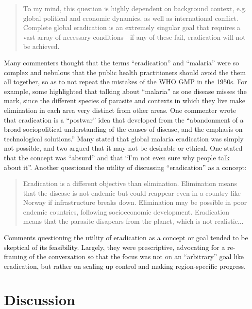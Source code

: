 \documentclass[]{article}
\begin{document}
\begin{quote}
To my mind, this question is highly dependent on background context, e.g. global political and economic dynamics, as well as international conflict. Complete global eradication is an extremely singular goal that requires a vast array of necessary conditions - if any of these fail, eradication will not be achieved.  
\end{quote}

Many commenters thought that the terms ``eradication'' and ``malaria''
were so complex and nebulous that the public health practitioners should
avoid the them all together, so as to not repeat the mistakes of the WHO
GMP in the 1950s. For example, some highlighted that talking about
``malaria'' as one disease misses the mark, since the different species
of parasite and contexts in which they live make elimination in each
area very distinct from other areas. One commenter wrote that
eradication is a ``postwar'' idea that developed from the ``abandonment
of a broad sociopolitical understanding of the causes of disease, and
the emphasis on technological solutions.'' Many stated that global
malaria eradication was simply not possible, and two argued that it may
not be desirable or ethical. One stated that the concept was ``absurd''
and that ``I'm not even sure why people talk about it''. Another
questioned the utility of discussing ``eradication'' as a concept:

\begin{quote}
Eradication is a different objective than elimination. Elimination means that the disease is not endemic but could reappear even in a country like Norway if infrastructure breaks down. Elimination may be possible in poor endemic countries, following socioeconomic development. Eradication means that the parasite disapears from the planet, which is not realistic...
\end{quote}

Comments questioning the utility of eradication as a concept or goal
tended to be skeptical of its feasibility. Largely, they were
prescriptive, advocating for a re-framing of the conversation so that
the focus was not on an ``arbitrary'' goal like eradication, but rather
on scaling up control and making region-specific progress.

\section{Discussion}\label{discussion}
\end{document}
